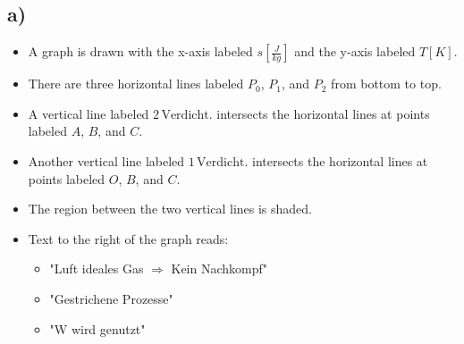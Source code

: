 

\subsection*{a)}

\begin{itemize}
    \item A graph is drawn with the x-axis labeled $s \left[ \frac{J}{kg} \right]$ and the y-axis labeled $T[K]$.
    \item There are three horizontal lines labeled $P_0$, $P_1$, and $P_2$ from bottom to top.
    \item A vertical line labeled $2 \, \text{Verdicht.}$ intersects the horizontal lines at points labeled $A$, $B$, and $C$.
    \item Another vertical line labeled $1 \, \text{Verdicht.}$ intersects the horizontal lines at points labeled $O$, $B$, and $C$.
    \item The region between the two vertical lines is shaded.
\end{itemize}

\begin{itemize}
    \item Text to the right of the graph reads:
    \begin{itemize}
        \item "Luft ideales Gas $\Rightarrow$ Kein Nachkompf"
        \item "Gestrichene Prozesse"
        \item "W wird genutzt"
    \end{itemize}
\end{itemize}